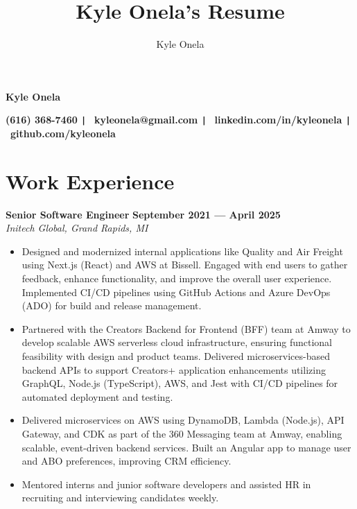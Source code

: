 \documentclass{article}
\title{Kyle Onela's Resume}
\author{Kyle Onela}
\begin{document}
\centerline{\LARGE\textbf{Kyle Onela}}
\smallskip
\centerline{
  \textbf{(616) 368-7460 \texttt{|}} \
  \textbf{kyleonela@gmail.com \texttt{|}} \
  \textbf{linkedin.com/in/kyleonela \texttt{|}} \
  \textbf{github.com/kyleonela}}

\section*{Work Experience}
\textbf{Senior Software Engineer} \hfill \textbf{September 2021 --- April 2025}\\
\textit{Initech Global, Grand Rapids, MI}
\begin{itemize}
  \item Designed and modernized internal applications like Quality and Air Freight using Next.js (React) and AWS at Bissell. Engaged with end users to gather feedback, enhance functionality, and improve the overall user experience. 
  Implemented CI/CD pipelines using GitHub Actions and Azure DevOps (ADO) for build and release management.
  \item Partnered with the Creators Backend for Frontend (BFF) team at Amway to develop scalable AWS serverless cloud infrastructure, ensuring functional feasibility with design and product teams. Delivered microservices-based backend APIs to support Creators+ application enhancements utilizing GraphQL, Node.js (TypeScript), AWS, and Jest with CI/CD pipelines for automated deployment and testing.
  \item Delivered microservices on AWS using DynamoDB, Lambda (Node.js), API Gateway, and CDK as part of the 360 Messaging team at Amway, enabling scalable, event-driven backend services. Built an Angular app to manage user and ABO preferences, improving CRM efficiency.
  \item Mentored interns and junior software developers and assisted HR in recruiting and interviewing candidates weekly.
\end{itemize}
\medskip
\end{document}

